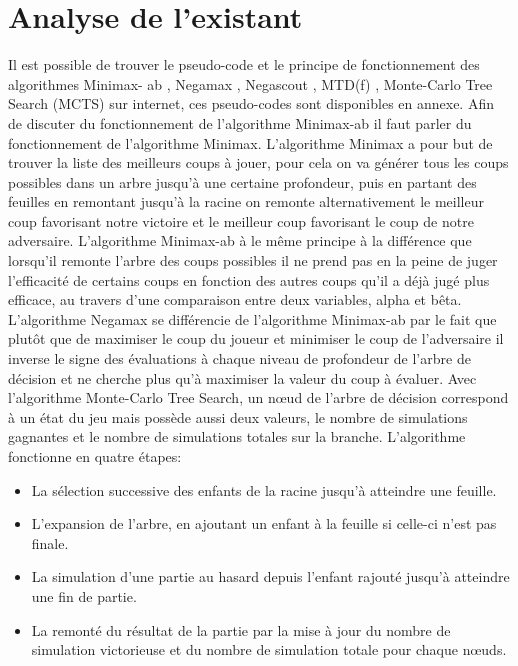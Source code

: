 \documentclass{article}
\begin{document}
\section{Analyse de l'existant}
Il est possible de trouver le pseudo-code et le principe de fonctionnement des algorithmes Minimax-
ab \cite{Minmax-ab}, Negamax \cite{Negamax}, Negascout \cite{Negascout}, MTD(f) \cite{MTD(f)}, Monte-Carlo Tree Search (MCTS)\cite{MCTS} sur internet, ces pseudo-codes sont disponibles en annexe.
\newline
Afin de discuter du fonctionnement de l'algorithme Minimax-ab il faut parler du fonctionnement de l'algorithme Minimax.
\newline
L'algorithme Minimax a pour but de trouver la liste des meilleurs coups à jouer, pour cela on va générer tous les coups possibles dans un arbre jusqu'à une certaine profondeur,  puis en partant des feuilles en remontant jusqu'à la racine on remonte alternativement le meilleur coup favorisant notre victoire et le meilleur coup favorisant le coup de notre adversaire\cite{Heuristiques}.
\newline\newline
L'algorithme Minimax-ab à le même principe à la différence que lorsqu'il remonte l'arbre des coups possibles il ne prend pas en la peine de juger l'efficacité de certains coups en fonction des autres coups qu'il a déjà jugé plus efficace, au travers d'une comparaison entre deux variables, alpha et bêta\cite{Heuristiques}.
\newline\newline
L'algorithme Negamax se différencie de l'algorithme Minimax-ab par le fait que plutôt que de maximiser le coup du joueur et minimiser le coup de l'adversaire il inverse le signe des évaluations à chaque niveau de profondeur de l'arbre de décision et ne cherche plus qu'à maximiser la valeur du coup à évaluer\cite{Negamax}.
\newline\newline
Avec l'algorithme Monte-Carlo Tree Search, un nœud de l'arbre de décision correspond à un état du jeu mais possède aussi deux valeurs, le nombre de simulations gagnantes et le nombre de simulations totales sur la branche.
L'algorithme fonctionne en quatre étapes\cite{MonteCarlo}:
\begin{itemize}
\item La sélection successive des enfants de la racine jusqu'à atteindre une feuille.
\item L'expansion de l'arbre, en ajoutant un enfant à la feuille si celle-ci n'est pas finale.
\item La simulation d'une partie au hasard depuis l'enfant rajouté jusqu'à atteindre une fin de partie.
\item La remonté du résultat de la partie par la mise à jour du nombre de simulation victorieuse et du nombre de simulation totale pour chaque nœuds.
\end{itemize}
\end{document}

